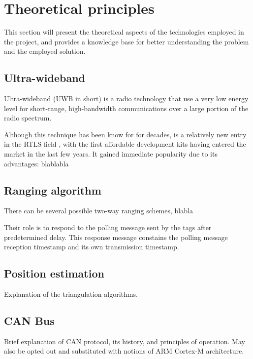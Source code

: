 \section{Theoretical principles}\label{sec:theory}
This section will present the theoretical aspects of the technologies employed in the project, and provides a knowledge base for better understanding the problem and the employed solution.


\subsection{Ultra-wideband}
Ultra-wideband (UWB in short) is a radio technology that use a very low energy level for short-range, high-bandwidth communications over a large portion of the radio spectrum.


Although this technique has been know for for decades, is a relatively new entry in the RTLS field \cite{uwb1}, with the first affordable development kits having entered the market in the last few years.
It gained immediate popularity due to its advantages: blablabla


\subsection{Ranging algorithm}
There can be several possible two-way ranging schemes, blabla

Their role is to respond to the polling message sent by the tags after predetermined delay. This response message constains the polling message reception timestamp and its own transmission timestamp.

\subsection{Position estimation}
Explanation of the triangulation algorithms.

\subsection{CAN Bus}
Brief explanation of CAN protocol, its history, and principles of operation.
May also be opted out and substituted with notions of ARM Cortex-M architecture.
